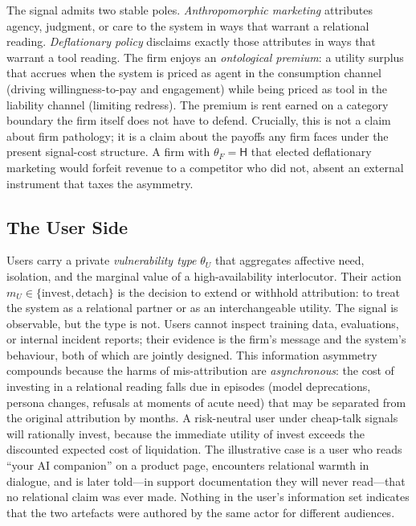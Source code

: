 The signal admits two stable poles. \emph{Anthropomorphic marketing} attributes agency, judgment, or care to the system in ways that warrant a relational reading. \emph{Deflationary policy} disclaims exactly those attributes in ways that warrant a tool reading. The firm enjoys an \emph{ontological premium}: a utility surplus that accrues when the system is priced as agent in the consumption channel (driving willingness-to-pay and engagement) while being priced as tool in the liability channel (limiting redress). The premium is rent earned on a category boundary the firm itself does not have to defend. Crucially, this is not a claim about firm pathology; it is a claim about the payoffs any firm faces under the present signal-cost structure. A firm with $\theta_F = \mathsf{H}$ that elected deflationary marketing would forfeit revenue to a competitor who did not, absent an external instrument that taxes the asymmetry.

\subsection{The User Side}
\label{subsec:user-side}

Users carry a private \emph{vulnerability type} $\theta_U$ that aggregates affective need, isolation, and the marginal value of a high-availability interlocutor. Their action $m_U \in \{\text{invest}, \text{detach}\}$ is the decision to extend or withhold attribution: to treat the system as a relational partner or as an interchangeable utility. The signal is observable, but the type is not. Users cannot inspect training data, evaluations, or internal incident reports; their evidence is the firm's message and the system's behaviour, both of which are jointly designed. This information asymmetry compounds because the harms of mis-attribution are \emph{asynchronous}: the cost of investing in a relational reading falls due in episodes (model deprecations, persona changes, refusals at moments of acute need) that may be separated from the original attribution by months. A risk-neutral user under cheap-talk signals will rationally invest, because the immediate utility of invest exceeds the discounted expected cost of liquidation. The illustrative case is a user who reads ``your AI companion'' on a product page, encounters relational warmth in dialogue, and is later told---in support documentation they will never read---that no relational claim was ever made. Nothing in the user's information set indicates that the two artefacts were authored by the same actor for different audiences.

